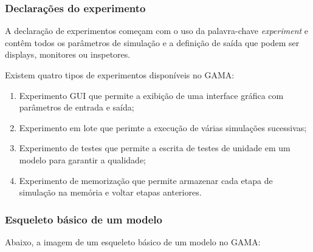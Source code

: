 

\subsubsection{Declarações do experimento}

A declaração de experimentos começam com o uso da palavra-chave \textit{experiment} e contêm todos os parâmetros de simulação e a definição de saída que podem ser displays, monitores ou inspetores. 


Existem quatro tipos de experimentos disponíveis no GAMA:

\begin{enumerate}
\item Experimento GUI que permite a exibição de uma interface gráfica com parâmetros de entrada e saída;
		
		

\item Experimento em lote que perimte a execução de várias simulações sucessivas;


\item Experimento de testes que permite a escrita de testes de unidade em um modelo para garantir a qualidade;


\item Experimento de memorização que permite armazenar cada etapa de simulação na memória e voltar etapas anteriores.

\end{enumerate}

\subsubsection{Esqueleto básico de um modelo}

Abaixo, a imagem de um esqueleto básico de um modelo no GAMA:


